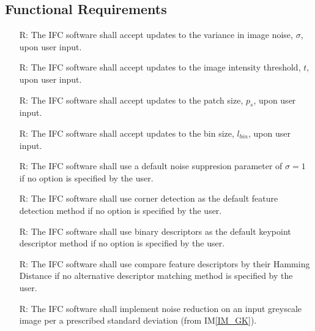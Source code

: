 \documentclass[12pt]{article}
\newcommand{\iref}[1]{IM\ref{#1}}
\newcounter{reqnum} %
\begin{document}
\subsection{Functional Requirements}

\noindent \begin{itemize}

\item[R\refstepcounter{reqnum}\thereqnum \label{R_Update_SD}:] The IFC software shall accept 
updates to the variance in image noise,  $\mathit{\sigma}$, upon user input.

\item[R\refstepcounter{reqnum}\thereqnum \label{R_Update_Intensity}:] The IFC software shall accept 
updates to the image intensity threshold, $\mathit{t}$, upon user input.

\item[R\refstepcounter{reqnum}\thereqnum \label{R_Update_Patch}:] The IFC software shall accept 
updates to the patch size, $\mathit{p_{s}}$, upon user input.

\item[R\refstepcounter{reqnum}\thereqnum \label{R_Update_BinSize}:] The IFC software shall accept 
updates to the bin size, $\mathit{l_{bin}}$, upon user input.

\item[R\refstepcounter{reqnum}\thereqnum \label{R_Default_Noise}:] The IFC software shall use a 
default noise suppresion parameter of $\sigma = 1$ if no option is specified by the user.

\item[R\refstepcounter{reqnum}\thereqnum \label{R_Default_FD}:] The IFC software shall use corner 
detection as the default feature detection method if no option is specified by the user.

\item[R\refstepcounter{reqnum}\thereqnum \label{R_Default_KD}:] The IFC software shall use binary 
descriptors as the default keypoint descriptor method if no option is specified by the user.

\item[R\refstepcounter{reqnum}\thereqnum \label{R_Default_FM}:] The IFC software shall use compare 
feature descriptors by their Hamming Distance if no alternative descriptor matching method 
is specified by the user.

\item[R\refstepcounter{reqnum}\thereqnum \label{R_NoiseReduction}:] The IFC software shall 
implement noise reduction on an input greyscale image per a prescribed standard deviation (from 
\iref{IM_GK}).


\end{itemize}
\end{document}
